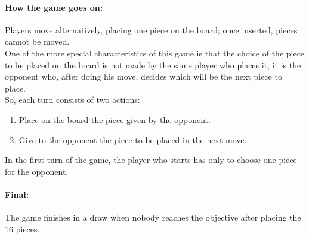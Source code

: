 \documentclass[a4paper,12pt]{article}
\begin{document}
		\paragraph{How the game goes on:} Players move alternatively, placing one piece on the board; once inserted, pieces cannot be moved. \\
		One of the more special characteristics of this game is that the choice of the piece to be placed on the board is not made by the same player who places it; it is the opponent who, after doing his move, decides which will be the next piece to place. \\
		So, each turn consists of two actions:
		\begin{enumerate}
			\item Place on the board the piece given by the opponent.
			\item Give to the opponent the piece to be placed in the next move.
		\end{enumerate}
		In the first turn of the game, the player who starts has only to choose one piece for the opponent.

		\paragraph{Final:} The game finishes in a draw when nobody reaches the objective after placing the 16 pieces.


	\newpage
\end{document}
